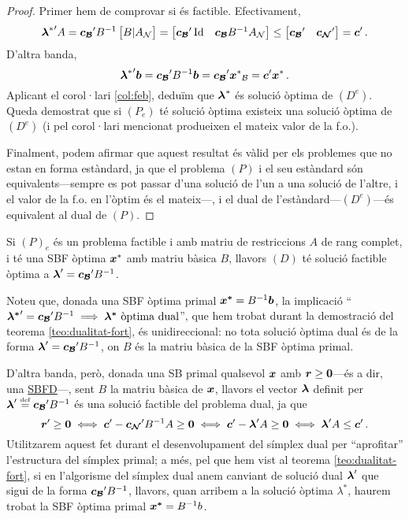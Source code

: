\begin{teo}
\begin{proof}
		Primer hem de comprovar si és factible. Efectivament, 
		\[
		{\boldsymbol{\lambda}^\ast}'A = 
		\boldsymbol{c_{\mathcal{B}}}' B^{-1}
		\begin{bmatrix}
		B 	\vert 	A_{\mathcal{N}}
		\end{bmatrix} =
		\begin{bmatrix}
		\boldsymbol{c_{\mathcal{B}}}' \operatorname{Id} & \boldsymbol{c_{\mathcal{B}}} B^{-1} A_{\mathcal{N}}    			
		\end{bmatrix}
		\le
		\begin{bmatrix}
		\boldsymbol{c_{\mathcal{B}}}' 	&\boldsymbol{c_{\mathcal{N}}}'
		\end{bmatrix}
		= \boldsymbol{c}'\,.
		\]
		D'altra banda, \[{\boldsymbol{\lambda}^\ast}'\boldsymbol{b} = \boldsymbol{c_{\mathcal{B}}}' B^{-1} \boldsymbol{b} =
		\boldsymbol{c_{\mathcal{B}}}' {\boldsymbol{x}^\ast}_{\mathcal{B}} = \boldsymbol{c}'{\boldsymbol{x}^\ast}\,. \] Aplicant el 
		corol·lari
		\ref{col:feb}, deduïm que $\boldsymbol{\lambda}^\ast$ és solució òptima de 
		$(D^e)$.
		Queda demostrat que si $(P_e)$ té solució òptima existeix una solució 
		òptima de
		$(D^e)$ (i pel corol·lari mencionat produeixen el mateix valor de la 
		f.o.).
		
		Finalment, podem afirmar que aquest resultat és vàlid per els problemes 
		que
		no estan en forma estàndard, ja que el problema $(P)$ i el seu 
		estàndard són
		equivalents---sempre es pot passar d'una solució de l'un a una solució 
		de
		l'altre, i el valor de la f.o. en l'òptim és el mateix---, i el dual de
		l'estàndard---$(D^e)$---és equivalent al dual de $(P)$.
	\end{proof}
\end{teo}

\begin{col}
	Si $\left(P\right)_e$ és un problema factible i amb matriu de restriccions
	$A$ de rang complet, i té una SBF òptima $\boldsymbol{x}^\ast$ amb matriu bàsica 
	$B$,
	llavors $\left(D\right)$ té solució factible òptima a $\boldsymbol{\lambda}' =
	\boldsymbol{c_{\mathcal{B}}}'B^{-1}$.
\end{col}

Noteu que, donada una SBF òptima primal $\boldsymbol{x^\ast} = B^{-1}\boldsymbol{b}$, la
implicació ``$\boldsymbol{\lambda^\ast}'= \boldsymbol{c_{\mathcal{B}}}'B^{-1} \implies \boldsymbol{\lambda^\ast}
\text{ òptima dual}$'', que hem trobat durant la demostració del teorema
\ref{teo:dualitat-fort}, és unidireccional: no tota solució òptima dual és de la
forma $\boldsymbol{\lambda}' = \boldsymbol{c_{\mathcal{B}}}'B^{-1}$, on $B$ és la matriu bàsica de la SBF
òptima primal. 

D'altra banda, però, donada una SB primal qualsevol $\boldsymbol{x}$ amb $\boldsymbol{r} \ge
\boldsymbol{0}$---és a dir, una \hyperref[defi:SBFD]{SBFD}---, sent $B$ la matriu bàsica
de $\boldsymbol{x}$, llavors el vector $\boldsymbol{\lambda}$ definit per $\boldsymbol{\lambda}' \stackrel{\text{\tiny def}}{=}
\boldsymbol{c_{\mathcal{B}}}'B^{-1}$ és una solució factible del problema dual, ja que
\[
\boldsymbol{r}'\ge \boldsymbol{0} \iff \boldsymbol{c}' - \boldsymbol{c_{\mathcal{N}}}'B^{-1}A \ge \boldsymbol{0} \iff \boldsymbol{c}' -
\boldsymbol{\lambda}'A \ge \boldsymbol{0}  \iff \boldsymbol{\lambda}'A \le \boldsymbol{c}'\,.
\]
Utilitzarem aquest fet durant el desenvolupament del símplex dual per
``aprofitar'' l'estructura del símplex primal; a més, pel que hem vist al
teorema \ref{teo:dualitat-fort}, si en l'algorisme del símplex dual anem
canviant de solució dual $\boldsymbol{\lambda}'$ que sigui de la forma $\boldsymbol{c_{\mathcal{B}}}'
B^{-1}$, llavors, quan arribem a la solució òptima $\lambda^\ast$, haurem trobat
la SBF òptima primal $\boldsymbol{x^\ast} = B^{-1}b$.

